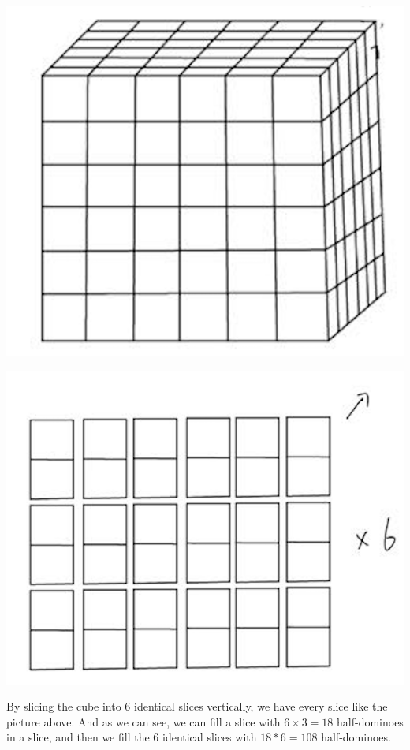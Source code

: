 \documentclass[12pt]{exam}
\begin{document}
\begin{solution}
\begin{qparts}
    \item 
    \begin{center}
        \includegraphics[scale=0.35]{Screenshot 2023-09-28 at 14.26.34.png}
    \end{center}
    
    \begin{center}
        \includegraphics[scale=0.4]{Screenshot 2023-09-28 at 14.26.50.png} 
    \end{center}
    By slicing the cube into 6 identical slices vertically, we have every slice like the picture above. And as we can see, we can fill a slice with $6 \times 3 = 18$ half-dominoes in a slice, and then we fill the 6 identical slices with $18 * 6 = 108$ half-dominoes.
    

\end{qparts}
\end{solution}
\end{document}

